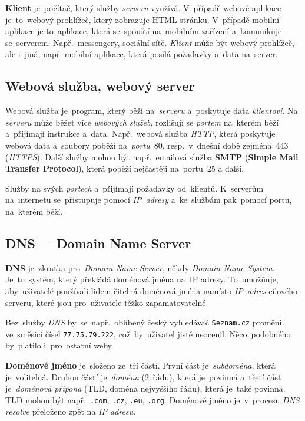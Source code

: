 \documentclass[10pt,a4paper]{article}
\begin{document}
    \textbf{Klient} je~počítač, který služby \emph{serveru} využívá. V~případě webové aplikace je~to~webový prohlížeč, který zobrazuje HTML stránku.
    V~případě mobilní aplikace je to~aplikace, která se~spouští na~mobilním zařízení a~komunikuje se~serverem. Např.~messengery, sociální sítě. \emph{Klient} může být webový prohlížeč, ale i~jiná, např. mobilní aplikace, která posílá požadavky a~data na~server. \cite{ClientServer}

        \subsection{Webová služba, webový server}
        Webová služba je~program, který běží na~\emph{serveru} a~poskytuje data \emph{klientovi}. Na \emph{serveru} může běžet více \emph{webových služeb}, rozlišují se \emph{portem} na~kterém běží a~přijímají instrukce a~data. Např.~webová služba \emph{HTTP}, která poskytuje webová data a~soubory poběží na~\emph{portu}~80, resp.~v~dnešní době zejména~443 (\emph{HTTPS}). Další služby mohou být např.~emailová služba \textbf{SMTP} (\textbf{Simple Mail Transfer Protocol}), která poběží nejčastěji na~portu~25 a další.
        
        Služby  na svých \emph{portech} a~přijímají požadavky od~klientů. K~serverům na~internetu se~přistupuje pomocí \emph{IP~adresy} a~ke~službám pak~pomocí portu, na~kterém běží. \cite{webserver:mdn}

        \subsection{DNS~--~Domain Name Server}
        \textbf{DNS} je~zkratka pro~\emph{Domain Name Server}, někdy \emph{Domain Name System}. Je~to~systém, který překládá doménová jména na~IP adresy. To~umožňuje, aby~uživatelé používali lidem čitelná doménová jména namísto \emph{IP~adres} cílového serveru, které jsou pro~uživatele těžko zapamatovatelné.
        
        Bez~služby \emph{DNS} by~se~např.~oblíbený český vyhledávač \texttt{Seznam.cz} proměnil ve~směsici čísel \texttt{77.75.79.222}, což~by~uživatel jistě neocenil. Něco~podobného by~platilo i~pro~ostatní weby.

        \textbf{Doménové jméno} je~složeno ze~tří částí. První část je~\emph{subdoména}, která je~volitelná. Druhou částí je~\emph{doména} (2.\,řádu), která je~povinná a~třetí část je~\emph{doménová přípona} (TLD, doména nejvyššího řádu), která je~také povinná. TLD mohou být např.~\texttt{.com}, \texttt{.cz}, \texttt{.eu}, \texttt{.org}. Doménové jméno je~v~procesu \emph{DNS resolve} přeloženo zpět na \emph{IP adresu}. \cite{tld:mdn}
        
\end{document}
